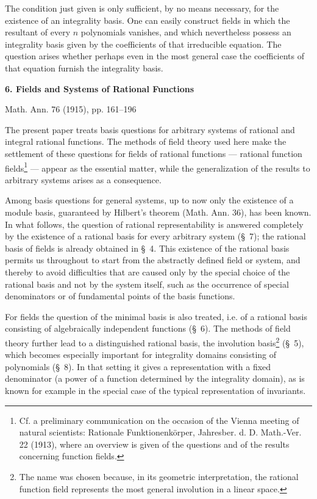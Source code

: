 \documentclass[11pt]{article}
\begin{document}
The condition just given is only sufficient, by no means necessary, for the existence of an integrality basis. One can easily construct fields in which the resultant of every $n$ polynomials vanishes, and which nevertheless possess an integrality basis given by the coefficients of that irreducible equation. The question arises whether perhaps even in the most general case the coefficients of that equation furnish the integrality basis.

\clearpage

\begin{center}
{\Large\bfseries 6. Fields and Systems of Rational Functions}\par
\vspace{1.2em}
Math. Ann. 76 (1915), pp. 161--196
\end{center}

\vspace{2em}

The present paper treats basis questions for arbitrary systems of rational and integral rational functions. The methods of field theory used here make the settlement of these questions for fields of rational functions --- rational function fields\footnote{Cf. a preliminary communication on the occasion of the Vienna meeting of natural scientists: Rationale Funktionenkörper, Jahresber. d. D. Math.-Ver. 22 (1913), where an overview is given of the questions and of the results concerning function fields.} --- appear as the essential matter, while the generalization of the results to arbitrary systems arises as a consequence.

Among basis questions for general systems, up to now only the existence of a module basis, guaranteed by Hilbert's theorem (Math. Ann. 36), has been known. In what follows, the question of rational representability is answered completely by the existence of a rational basis for every arbitrary system (\S\ 7); the rational basis of fields is already obtained in \S\ 4. This existence of the rational basis permits us throughout to start from the abstractly defined field or system, and thereby to avoid difficulties that are caused only by the special choice of the rational basis and not by the system itself, such as the occurrence of special denominators or of fundamental points of the basis functions.

For fields the question of the minimal basis is also treated, i.e. of a rational basis consisting of algebraically independent functions (\S\ 6). The methods of field theory further lead to a distinguished rational basis, the involution basis\footnote{The name was chosen because, in its geometric interpretation, the rational function field represents the most general involution in a linear space.} (\S\ 5), which becomes especially important for integrality domains consisting of polynomials (\S\ 8). In that setting it gives a representation with a fixed denominator (a power of a function determined by the integrality domain), as is known for example in the special case of the typical representation of invariants.
\end{document}

